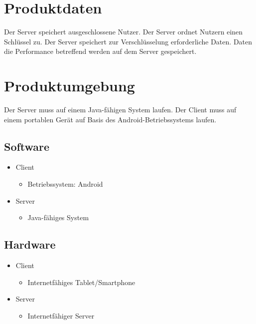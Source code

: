\documentclass[a4paper,10pt]{scrartcl}
\begin{document}
\section{Produktdaten}

\begin{usecase}
 {Der Server speichert ausgeschlossene Nutzer.}
 {Der Server ordnet Nutzern einen Schlüssel zu.}
 {Der Server speichert zur Verschlüsselung erforderliche Daten.}
 {Daten die Performance betreffend werden auf dem Server gespeichert.}
\end{usecase}

\section{Produktumgebung}
Der Server muss auf einem Java-fähigen System laufen.
Der Client muss auf einem portablen Gerät auf Basis des Android-Betriebssystems laufen.
\subsection{Software}
\begin{itemize}
\item Client
   \begin{itemize}
      \item Betriebssystem: Android
   \end{itemize}
\item Server
   \begin{itemize}
      \item Java-fähiges System
   \end{itemize}
\end{itemize}

\subsection{Hardware}
\begin{itemize}
\item Client
   \begin{itemize}
      \item Internetfähiges Tablet/Smartphone
   \end{itemize}
\item Server
   \begin{itemize}
      \item Internetfähiger Server
   \end{itemize}
\end{itemize}
\end{document}

